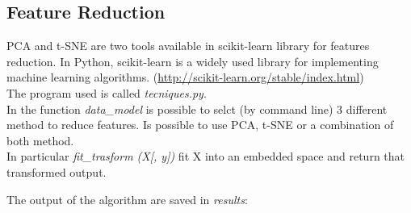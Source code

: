 \documentclass[12pt]{article} %
\begin{document}
\subsection {Feature Reduction}
 PCA and t-SNE  are two tools available in scikit-learn library for features reduction. In Python, scikit-learn is a widely used library for implementing machine learning algorithms. (\url{http://scikit-learn.org/stable/index.html})\\
The program used is called \textit{tecniques.py}.\\
In the function \textit{data\_model} is possible to selct (by command line) 3 different method to reduce features. Is possible to use PCA, t-SNE or a combination of both method.\\
In particular \textit{fit\_trasform (X[, y])} fit X into an embedded space and return that transformed output. 

\begin{figure}[H] %
 \end{figure}

 The output of the algorithm are saved in \textit{results}:

\begin{figure}[H] %
 \end{figure}

\newpage
\end{document}
